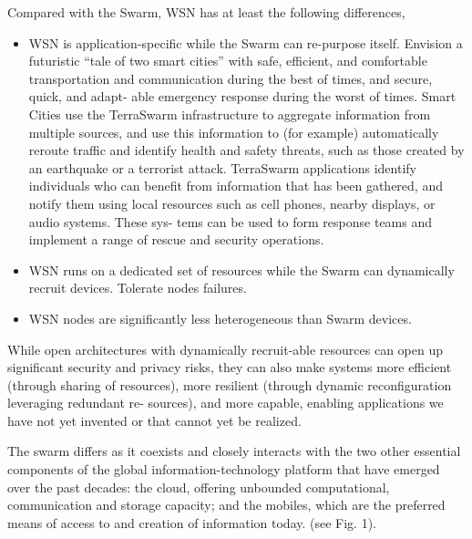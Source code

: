 Compared with the Swarm, WSN has at least the following differences,

\begin{itemize}

\item WSN is application-specific while the Swarm can re-purpose
  itself.  Envision a futuristic “tale of two smart cities” with safe, efficient,
  and comfortable transportation and communication during the best of times, and
  secure, quick, and adapt- able emergency response during the worst of
  times. Smart Cities use the TerraSwarm infrastructure to aggregate information
  from multiple sources, and use this information to (for example) automatically
  reroute traffic and identify health and safety threats, such as those created
  by an earthquake or a terrorist attack. TerraSwarm applications identify
  individuals who can benefit from information that has been gathered, and
  notify them using local resources such as cell phones, nearby displays, or
  audio systems. These sys- tems can be used to form response teams and
  implement a range of rescue and security operations.

\item WSN runs on a dedicated set of resources while the Swarm can dynamically
  recruit devices. Tolerate nodes failures.

\item WSN nodes are significantly less heterogeneous than Swarm devices.

\end{itemize}

While open architectures with dynamically recruit-able resources can open up
significant security and privacy risks, they can also make systems more
efficient (through sharing of resources), more resilient (through dynamic
reconfiguration leveraging redundant re- sources), and more capable, enabling
applications we have not yet invented or that cannot yet be realized.

The swarm differs as it coexists and closely interacts with the two other
essential components of the global information-technology platform that have
emerged over the past decades: the cloud, offering unbounded computational,
communication and storage capacity; and the mobiles, which are the preferred
means of access to and creation of information today. (see Fig. 1).

